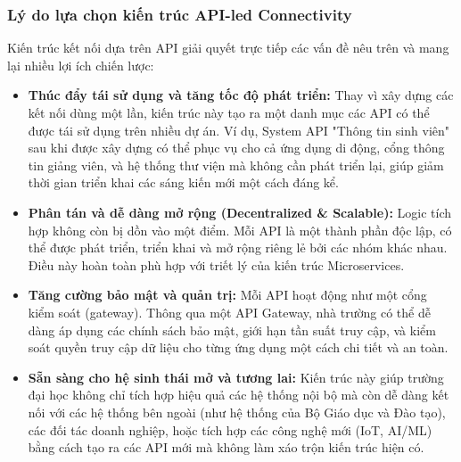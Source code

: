 \subsubsection{Lý do lựa chọn kiến trúc API-led Connectivity}
Kiến trúc kết nối dựa trên API giải quyết trực tiếp các vấn đề nêu trên và mang lại nhiều lợi ích chiến lược:
\begin{itemize}
    \item \textbf{Thúc đẩy tái sử dụng và tăng tốc độ phát triển:} Thay vì xây dựng các kết nối dùng một lần, kiến trúc này tạo ra một danh mục các API có thể được tái sử dụng trên nhiều dự án. Ví dụ, System API "Thông tin sinh viên" sau khi được xây dựng có thể phục vụ cho cả ứng dụng di động, cổng thông tin giảng viên, và hệ thống thư viện mà không cần phát triển lại, giúp giảm thời gian triển khai các sáng kiến mới một cách đáng kể.
    \item \textbf{Phân tán và dễ dàng mở rộng (Decentralized \& Scalable):} Logic tích hợp không còn bị dồn vào một điểm. Mỗi API là một thành phần độc lập, có thể được phát triển, triển khai và mở rộng riêng lẻ bởi các nhóm khác nhau. Điều này hoàn toàn phù hợp với triết lý của kiến trúc Microservices.
    \item \textbf{Tăng cường bảo mật và quản trị:} Mỗi API hoạt động như một cổng kiểm soát (gateway). Thông qua một API Gateway, nhà trường có thể dễ dàng áp dụng các chính sách bảo mật, giới hạn tần suất truy cập, và kiểm soát quyền truy cập dữ liệu cho từng ứng dụng một cách chi tiết và an toàn.
    \item \textbf{Sẵn sàng cho hệ sinh thái mở và tương lai:} Kiến trúc này giúp trường đại học không chỉ tích hợp hiệu quả các hệ thống nội bộ mà còn dễ dàng kết nối với các hệ thống bên ngoài (như hệ thống của Bộ Giáo dục và Đào tạo), các đối tác doanh nghiệp, hoặc tích hợp các công nghệ mới (IoT, AI/ML) bằng cách tạo ra các API mới mà không làm xáo trộn kiến trúc hiện có.
\end{itemize}